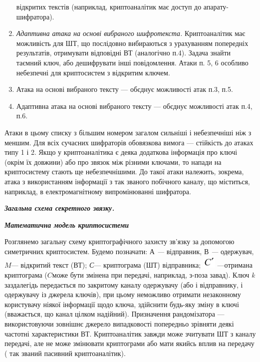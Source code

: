 \begin{enumerate}
відкритих текстів (наприклад, криптоаналітик має доступ до апарату-шифратора).
\item \textit{Адаптивна атака на основі вибраного шифротекста.} Криптоаналітик
має можливість для ШТ, що послідовно вибираються з урахуванням попередніх
результатів,  отримувати відповідні ВТ (аналогічно п.4). Задача знайти таємний
ключ, або дешифрувати інші повідомлення. Атаки п. 5, 6 особливо небезпечні для
криптосистем з відкритим ключем.
\item Атака на основі вибраного тексту  --- об{\textquotesingle}єднує можливості
атак п.3, п.5.
\item Адаптивна атака на основі вибраного тексту  --- об{\textquotesingle}єднує
можливості атак п.4, п.6.
\end{enumerate}

\bigskip

 Атаки в цьому списку з більшим номером загалом сильніші і небезпечніші  ніж з
меншим. Для всіх сучасних шифраторів обов{\textquotesingle}язкова вимога ---
стійкість до атаках типу 1 і 2. Якщо у криптоаналітика є деяка додаткова
інформація про ключі (окрім їх довжини) або про зв{\textquotesingle}язок між
різними ключами, то напади на криптосистему  стають ще небезпечнішими. До такої
атаки належить, зокрема, атака з використанням інформації з так званого
побічного каналу, що міститься, наприклад, в електромагнітному випромінюванні
шифратора.


\bigskip


\bigskip

{\centering\bfseries\itshape
Загальна схема секретного зв{\textquotesingle}язку.
\par}

{\centering\bfseries\itshape
 Математична модель криптосистеми
\par}


\bigskip


\bigskip

Розглянемо загальну схему криптографічного захисту зв’язку за допомогою
симетричних криптосистем.  Будемо позначати: А \textit{--- }відправник, В
\textit{--- }одержувач, $M$--- відкритий текст (ВТ);
\textit{С}--- криптограма (ШТ) відправника; 
\includegraphics[width=0.252in,height=0.2398in]{crypt-img/crypt-img3.png} 
---отримана криптограма ($C$може бути змінена при передачі,
наприклад, з-поза завад). Ключ \textit{k }заздалегідь передається по закритому
каналу одержувачу (або і відправнику, і одержувачу із джерела ключів), при
цьому неможливо отримати незаконному користувачу ніякої інформації щодо ключа,
здійснити будь-яку зміну в ключі  (вважається, що канал цілком надійний).
Призначення рандомізатора --- використовуючи  зовнішнє джерело випадковості
попередньо зрівняти деякі частотні характеристики ВТ.  Криптоаналітик завжди
може зчитувати ШТ з каналу передачі, але не може змінювати криптограми або мати
якийсь вплив на передачу ( так званий пасивний криптоаналітик).



